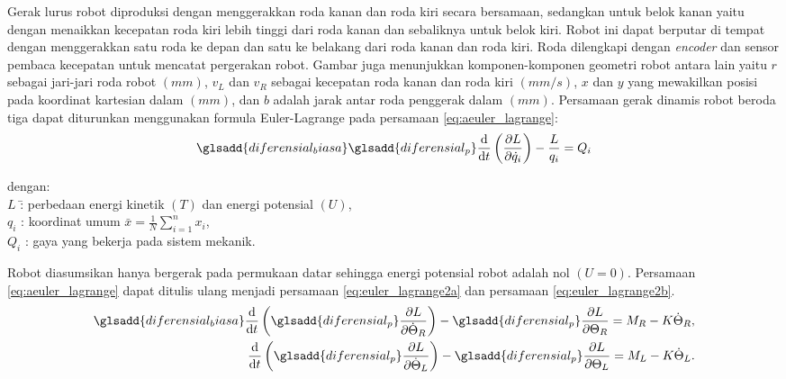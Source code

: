 Gerak lurus robot diproduksi dengan menggerakkan roda kanan dan roda kiri secara bersamaan, sedangkan untuk belok kanan yaitu dengan menaikkan kecepatan roda kiri lebih tinggi dari roda kanan dan sebaliknya untuk belok kiri. Robot ini dapat berputar di tempat dengan menggerakkan satu roda ke depan dan satu ke belakang dari roda kanan dan roda kiri. Roda dilengkapi dengan \textit{encoder} dan sensor pembaca kecepatan untuk mencatat pergerakan robot. Gambar juga menunjukkan komponen-komponen geometri robot antara lain yaitu $r$ sebagai jari-jari roda robot $(mm)$, $v_L$ dan $v_R$ sebagai kecepatan roda kanan dan roda kiri $(mm/s)$, $x$ dan $y$ yang mewakilkan posisi pada koordinat kartesian dalam $(mm)$, dan $b$ adalah jarak antar roda penggerak dalam $(mm)$. Persamaan gerak dinamis robot beroda tiga dapat diturunkan menggunakan formula Euler-Lagrange\cite{b4} pada persamaan \ref*{eq:aeuler_lagrange}:
\begin{equation}
    \glsadd{diferensial_biasa}\glsadd{diferensial_p}
    \diff{}{t}\left(\diffp{L}{\dot{q}_i}\right)-\frac{L}{q_i}=Q_i
    \label{eq:aeuler_lagrange}
\end{equation}
\begin{tabbing}
    dengan: \=\\
        \>$L$ \qquad \=: perbedaan energi kinetik $(T)$ dan energi potensial $(U)$,\\ 
        \>$q_i$ \>: koordinat umum $\bar{x}=\frac{1}{N}\sum_{i=1}^n x_i$,\\
        \>$Q_i$ \>: gaya yang bekerja pada sistem mekanik.
\end{tabbing}
Robot diasumsikan hanya bergerak pada permukaan datar sehingga energi potensial robot adalah nol $(U = 0)$. Persamaan \ref*{eq:aeuler_lagrange} dapat ditulis ulang menjadi persamaan \ref*{eq:euler_lagrange2a} dan persamaan \ref*{eq:euler_lagrange2b}.
\begin{align}
    \label{eq:euler_lagrange2a}
    \glsadd{diferensial_biasa}\diff{}{t}\left(\glsadd{diferensial_p}\diffp{L}{\dot{\Theta}_R}\right)-\glsadd{diferensial_p}\diffp{L}{\Theta_R}=M_R-K\dot{\Theta}_R,\\
    \label{eq:euler_lagrange2b}
    \diff{}{t}\left(\glsadd{diferensial_p}\diffp{L}{\dot{\Theta}_L}\right)-\glsadd{diferensial_p}\diffp{L}{\Theta_L}=M_L-K\dot{\Theta}_L.
\end{align}
